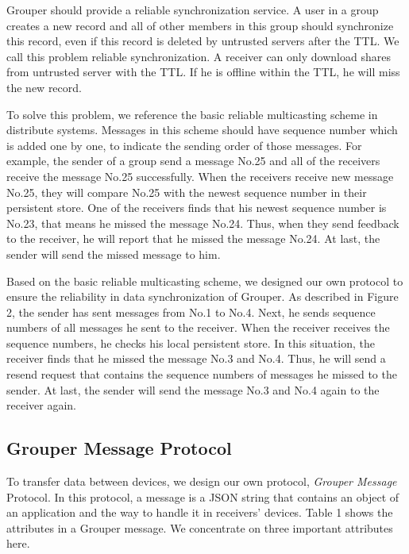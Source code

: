 \documentclass[twocolumn,10pt]{article}
\begin{document}
Grouper should provide a reliable synchronization service. 
A user in a group creates a new record and all of other members in this group should synchronize this record, even if this record is deleted by untrusted servers after the TTL. 
We call this problem reliable synchronization. 
A receiver can only download shares from untrusted server with the TTL. 
If he is offline within the TTL, he will miss the new record.

To solve this problem, we reference the basic reliable multicasting scheme in distribute systems. 
Messages in this scheme should have sequence number which is added one by one, to indicate the sending order of those messages. 
For example, the sender of a group send a message No.25 and all of the receivers receive the message No.25 successfully. 
When the receivers receive new message No.25, they will compare No.25 with the newest sequence number in their persistent store. 
One of the receivers finds that his newest sequence number is No.23, that means he missed the message No.24. 
Thus, when they send feedback to the receiver, he will report that he missed the message No.24. 
At last, the sender will send the missed message to him.

Based on the basic reliable multicasting scheme, we designed our own protocol to ensure the reliability in data synchronization of Grouper. 
As described in Figure 2, the sender has sent messages from No.1 to No.4. 
Next, he sends sequence numbers of all messages he sent to the receiver. 
When the receiver receives the sequence numbers, he checks his local persistent store. 
In this situation, the receiver finds that he missed the message No.3 and No.4. 
Thus, he will send a resend request that contains the sequence numbers of messages he missed to the sender. 
At last, the sender will send the message No.3 and No.4 again to the receiver again.

\subsection{Grouper Message Protocol}

To transfer data between devices, we design our own protocol, \emph{Grouper Message} Protocol. 
In this protocol, a message is a JSON string that contains an object of an application and the way to handle it in receivers’ devices.
Table 1 shows the attributes in a Grouper message.
We concentrate on three important attributes here.
\end{document}
